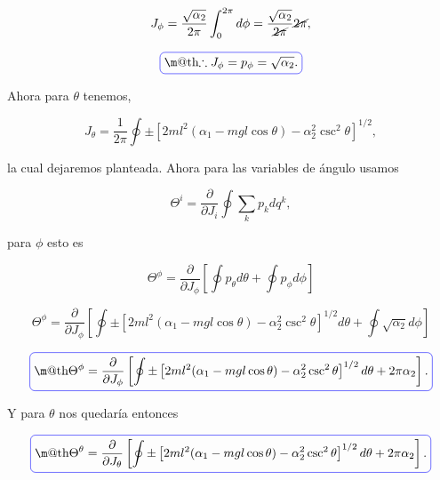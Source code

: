 \documentclass[a4paper,10pt]{article}
\makeatletter
\numberwithin{equation}{section}
\newcommand*{\boxcolor}{blue}
\renewcommand{\boxed}[1]{\textcolor{\boxcolor}{%
\tikz[baseline={([yshift=-1ex]current bounding box.center)}] \node [rectangle, minimum width=1ex,rounded corners,draw] {\normalcolor\m@th$\displaystyle#1$};}}
\makeatother
\begin{document}
\begin{equation}
 J_\phi = \frac{\sqrt{\alpha_2}}{2\pi}\int_0^{2\pi} d\phi =  
 \frac{\sqrt{\alpha_2}}{\cancel{2\pi}}\cancel{2\pi},
\end{equation}

\begin{equation}
 \boxed{\therefore J_\phi = p_\phi = \sqrt{\alpha_2}.}
\end{equation}

Ahora para $\theta$ tenemos, 

\begin{equation}
 J_\theta = \frac{1}{2\pi}\oint \pm \left[
 2ml^2(\alpha_1 - mgl\cos{\theta}) -  \alpha_2^2\csc^2{\theta}\right]^{1/2},
\end{equation}

la cual dejaremos planteada. Ahora para las variables de ángulo usamos 

\begin{equation}
 \Theta^i = \frac{\partial}{\partial J_i}\oint \sum_k p_kdq^k,
\end{equation}

para $\phi$ esto es 

\begin{equation}
 \Theta^\phi = \frac{\partial}{\partial J_\phi}\left[ \oint p_\theta d\theta + 
 \oint p_\phi d\phi\right]
\end{equation}

\begin{equation}
 \Theta^\phi = \frac{\partial}{\partial J_\phi}\left[ \oint  
  \pm \left[2ml^2(\alpha_1 - mgl\cos{\theta}) -  
  \alpha_2^2\csc^2{\theta}\right]^{1/2}d\theta + 
  \oint \sqrt{\alpha_2} d\phi\right]
\end{equation}

\begin{equation}
 \boxed{ \Theta^\phi = \frac{\partial}{\partial J_\phi}\left[ \oint  
  \pm \left[2ml^2(\alpha_1 - mgl\cos{\theta}) -  
  \alpha_2^2\csc^2{\theta}\right]^{1/2}d\theta + 
  2\pi \alpha_2 \right].}
\end{equation}

Y para $\theta$ nos quedaría entonces 

\begin{equation}
 \boxed{ \Theta^\theta = \frac{\partial}{\partial J_\theta}\left[ \oint  
  \pm \left[2ml^2(\alpha_1 - mgl\cos{\theta}) -  
  \alpha_2^2\csc^2{\theta}\right]^{1/2}d\theta + 
  2\pi \alpha_2 \right].}
\end{equation}
\end{document}
